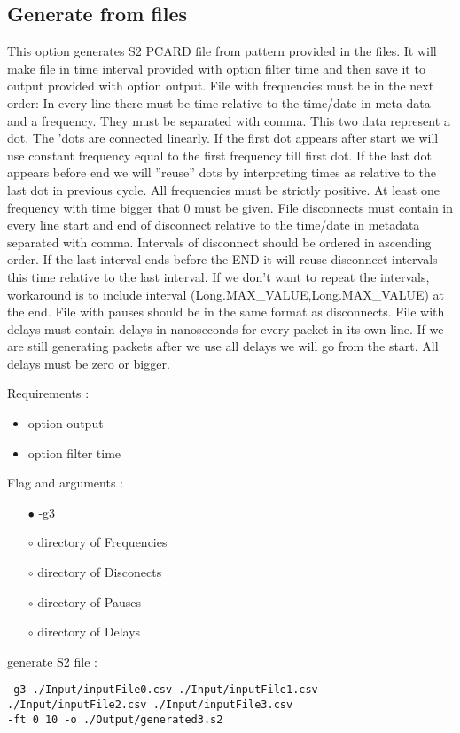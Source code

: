 \documentclass[english]{article}
\begin{document}
\subsection{Generate from files}
This option generates S2 PCARD file from pattern provided in the files. It will make file in time interval provided with option filter time and then save it to output provided with option output. File with frequencies must be in the next order: In every line there must be time relative to the time/date in meta data and a frequency. They must be separated with comma. This two data represent a dot. The 'dots are connected linearly. If the first dot appears after start we will use constant frequency equal to the first frequency till first dot. If the last dot appears before end we will ''reuse'' dots by interpreting times as relative to the last dot in previous cycle. All frequencies must be strictly positive. At least one frequency with time bigger that 0 must be given. File disconnects must contain in every line start and end of disconnect relative to the time/date in metadata separated with comma. Intervals of disconnect should be ordered in ascending order. If the last interval ends before the END it will reuse disconnect intervals this time relative to the last interval. If we don't want to repeat the intervals, workaround is to include interval (Long.MAX\_VALUE,Long.MAX\_VALUE) at the end. File with pauses should be in the same format as disconnects. File with delays must contain delays in nanoseconds for every packet in its own line. If we are still generating packets after we use all delays we will go from the start. All delays must be zero or bigger.

\noindent Requirements : 
\begin{itemize}
\item option output
\item option filter time
\end{itemize}
Flag and arguments :

\begin{itemize}
\item[$\bullet$] -g3
\item[$\circ$] directory of Frequencies
\item[$\circ$] directory of Disconects
\item[$\circ$] directory of Pauses
\item[$\circ$] directory of Delays


\end{itemize}
generate S2 file : 
\begin{lstlisting} 
-g3 ./Input/inputFile0.csv ./Input/inputFile1.csv
./Input/inputFile2.csv ./Input/inputFile3.csv 
-ft 0 10 -o ./Output/generated3.s2
\end{lstlisting}
\end{document}
